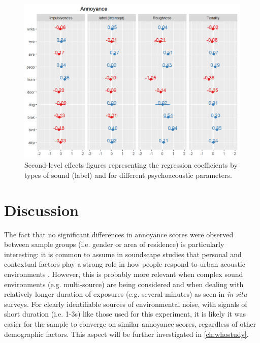 \begin{figure}[h]
  \centering
  \includegraphics[width=\textwidth]{Figures/OrganMLMAnnoyanceRandom.png}
  \caption{Second-level effects figures representing the regression coefficients by types of sound (label) and for different psychoacoustic parameters. \label{fig:annoyance-effects}
}
\end{figure}


\section{Discussion}

The fact that no significant differences in annoyance scores were observed between sample groups (i.e. gender or area of residence) is particularly interesting: it is common to assume in soundscape studies that personal and contextual factors play a strong role in how people respond to urban acoustic environments \citep{Kang2016Ten}. However, this is probably more relevant when complex sound environments (e.g. multi-source) are being considered and when dealing with relatively longer duration of exposures (e.g. several minutes) as seen in \textit{in situ} surveys. For clearly identifiable sources of environmental noise, with signals of short duration (i.e. 1-3s) like those used for this experiment, it is likely it was easier for the sample to converge on similar annoyance scores, regardless of other demographic factors. This aspect will be further investigated in \cref{ch:whostudy}.


